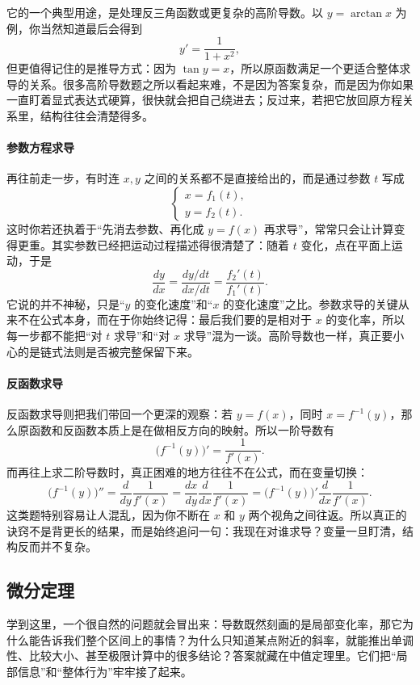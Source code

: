 \documentclass[UTF8]{ctexbook}
\begin{document}
它的一个典型用途，是处理反三角函数或更复杂的高阶导数。以 $y=\arctan x$ 为例，你当然知道最后会得到
\[
y'=\frac{1}{1+x^2},
\]
但更值得记住的是推导方式：因为 $\tan y=x$，所以原函数满足一个更适合整体求导的关系。很多高阶导数题之所以看起来难，不是因为答案复杂，而是因为你如果一直盯着显式表达式硬算，很快就会把自己绕进去；反过来，若把它放回原方程关系里，结构往往会清楚得多。

\paragraph{参数方程求导}
再往前走一步，有时连 $x,y$ 之间的关系都不是直接给出的，而是通过参数 $t$ 写成
\[
\begin{cases}
 x=f_1(t),\\
 y=f_2(t).
\end{cases}
\]
这时你若还执着于“先消去参数、再化成 $y=f(x)$ 再求导”，常常只会让计算变得更重。其实参数已经把运动过程描述得很清楚了：随着 $t$ 变化，点在平面上运动，于是
\[
\frac{dy}{dx}=\frac{dy/dt}{dx/dt}=\frac{f_2'(t)}{f_1'(t)}.
\]
它说的并不神秘，只是“$y$ 的变化速度”和“$x$ 的变化速度”之比。参数求导的关键从来不在公式本身，而在于你始终记得：最后我们要的是相对于 $x$ 的变化率，所以每一步都不能把“对 $t$ 求导”和“对 $x$ 求导”混为一谈。高阶导数也一样，真正要小心的是链式法则是否被完整保留下来。

\paragraph{反函数求导}
反函数求导则把我们带回一个更深的观察：若 $y=f(x)$，同时 $x=f^{-1}(y)$，那么原函数和反函数本质上是在做相反方向的映射。所以一阶导数有
\[
\bigl(f^{-1}(y)\bigr)'=\frac{1}{f'(x)}.
\]
而再往上求二阶导数时，真正困难的地方往往不在公式，而在变量切换：
\[
\bigl(f^{-1}(y)\bigr)''=\frac{d}{dy}\frac{1}{f'(x)}
=\frac{dx}{dy}\frac{d}{dx}\frac{1}{f'(x)}
=\bigl(f^{-1}(y)\bigr)'\frac{d}{dx}\frac{1}{f'(x)}.
\]
这类题特别容易让人混乱，因为你不断在 $x$ 和 $y$ 两个视角之间往返。所以真正的诀窍不是背更长的结果，而是始终追问一句：我现在对谁求导？变量一旦盯清，结构反而并不复杂。

\subsection{微分定理}
学到这里，一个很自然的问题就会冒出来：导数既然刻画的是局部变化率，那它为什么能告诉我们整个区间上的事情？为什么只知道某点附近的斜率，就能推出单调性、比较大小、甚至极限计算中的很多结论？答案就藏在中值定理里。它们把“局部信息”和“整体行为”牢牢接了起来。
\end{document}
